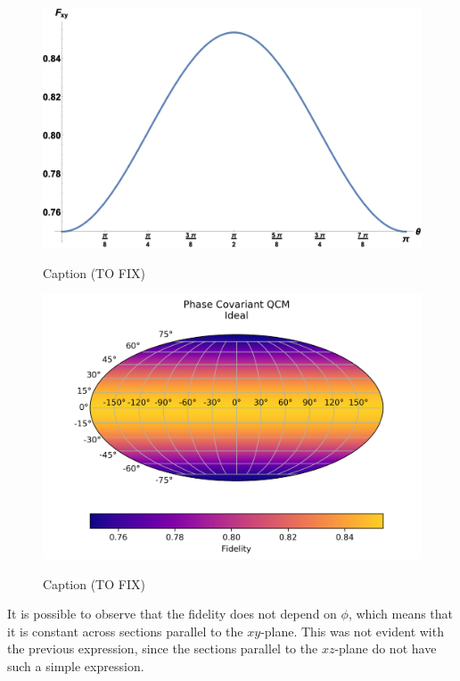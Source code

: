\begin{figure}[H]
\centering
    \begin{minipage}[t]{.5\textwidth}
        \centering
        \includegraphics[width=\textwidth]{Figures/plot_1D_phase_covariant_different_labels.png}
        \label{fig:phase_covariant_rotated_1d}
        \caption{Caption (TO FIX)}
    \end{minipage}%
    \begin{minipage}[t]{.5\textwidth}
        \centering
        \includegraphics[width=\textwidth]{Figures/phase_covariant_rotated.png}
        \label{fig:phase_covariant_rotated}
        \caption{Caption (TO FIX)}
    \end{minipage}
\end{figure}

It is possible to observe that the fidelity does not depend on $\phi$, which means that it is constant across sections parallel to the $xy$-plane.
This was not evident with the previous expression, since the sections parallel to the $xz$-plane do not have such a simple expression.

